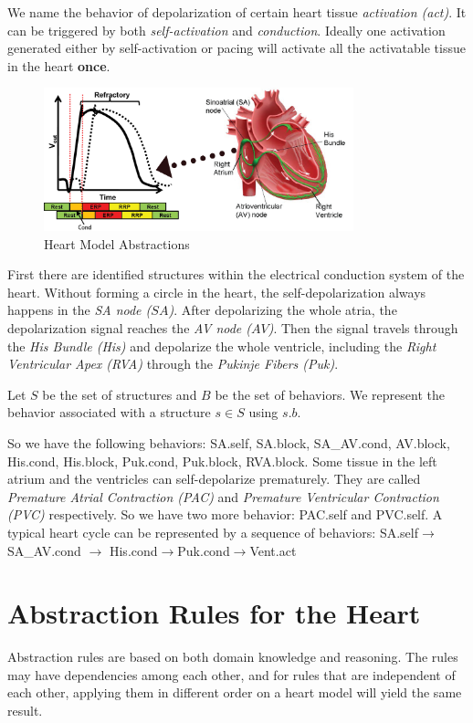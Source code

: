 \documentclass{llncs}
\begin{document}
We name the behavior of depolarization of certain heart tissue \emph{activation (act)}. It can be triggered by both \emph{self-activation} and \emph{conduction}. Ideally one activation generated either by self-activation or pacing will activate all the activatable tissue in the heart \textbf{once}.
\begin{figure}[!t]
		\centering
		\includegraphics[width=0.8\textwidth]{figs/basic.png}
		\caption{\small Heart Model Abstractions}
		\label{fig:abs}
\end{figure}
First there are identified structures within the electrical conduction system of the heart. Without forming a circle in the heart, the self-depolarization always happens in the \emph{SA node ($SA$)}. After depolarizing the whole atria, the depolarization signal reaches the \emph{AV node ($AV$)}. Then the signal travels through the \emph{His Bundle (His)} and depolarize the whole ventricle, including the \emph{Right Ventricular Apex (RVA)} through the \emph{Pukinje Fibers (Puk)}. 

Let $S$ be the set of structures and $B$ be the set of behaviors. We represent the behavior associated with a structure $s\in S$ using $s.b$. 

So we have the following behaviors: \textsf{SA.self}, \textsf{SA.block},  \textsf{SA\_AV.cond}, \textsf{AV.block}, \textsf{His.cond}, \textsf{His.block}, \textsf{Puk.cond}, \textsf{Puk.block}, \textsf{RVA.block}. Some tissue in the left atrium and the ventricles can self-depolarize prematurely. They are called \emph{Premature Atrial Contraction (PAC)} and \emph{Premature Ventricular Contraction (PVC)} respectively. So we have two more behavior: \textsf{PAC.self} and \textsf{PVC.self}. A typical heart cycle can be represented by a sequence of behaviors: \textsf{SA.self$\rightarrow$SA\_AV.cond $\rightarrow$ His.cond$\rightarrow$Puk.cond$\rightarrow$Vent.act}

\section{Abstraction Rules for the Heart}
Abstraction rules are based on both domain knowledge and reasoning. The rules may have dependencies among each other, and for rules that are independent of each other, applying them in different order on a heart model will yield the same result. 
\end{document}
